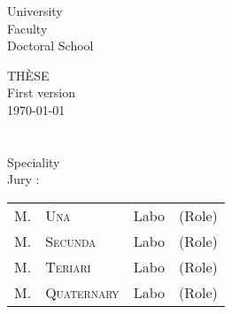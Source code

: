 \thispagestyle{empty}
	\begin{center}
		\avantgarLarge University\\[1ex]
		\avantgar Faculty\\[1ex]
		\avantgar Doctoral School\\[3ex]
	\end{center}

	\begin{center}
		\avantgarboldHuge THÈSE\\[1.5ex]

		\avantgarlarge First version\\[1ex]
		\avantgarlarge \today\\[1ex]
		\avantgarLarge \myauthor\\[1ex]

		\avantgarboldHuge \mytitlefr\\[2ex]

		\avantgarlarge Speciality\\[5ex]

		\avantgarlarge Jury :\\[1ex]
		\begin{tabular}{llll}
			{\Large M.} & {\Large\textsc{Una}}			& {\large Labo}	& {\large(Role)}	\\
			{\Large M.} & {\Large\textsc{Secunda}}		& {\large Labo}	& {\large(Role)}	\\
			{\Large M.} & {\Large\textsc{Teriari}}		& {\large Labo}	& {\large(Role)}	\\
			{\Large M.} & {\Large\textsc{Quaternary}} 	& {\large Labo}	& {\large(Role)}	\\
		\end{tabular}
	\end{center}
